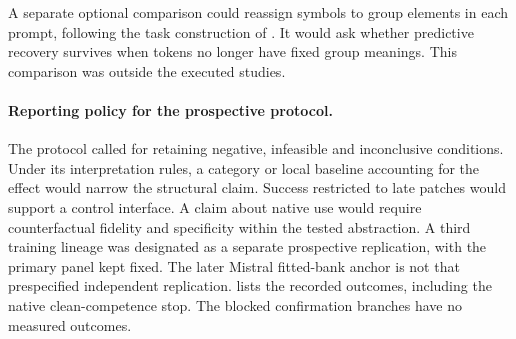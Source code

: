 A separate optional comparison could reassign symbols to group elements in each prompt, following the task construction of \citet[Section~2]{todd2026algebra}. It would ask whether predictive recovery survives when tokens no longer have fixed group meanings. This comparison was outside the executed studies.

\paragraph{Reporting policy for the prospective protocol.}
The protocol called for retaining negative, infeasible and inconclusive conditions. Under its interpretation rules, a category or local baseline accounting for the effect would narrow the structural claim. Success restricted to late patches would support a control interface. A claim about native use would require counterfactual fidelity and specificity within the tested abstraction. A third training lineage was designated as a separate prospective replication, with the primary panel kept fixed. The later Mistral fitted-bank anchor is not that prespecified independent replication.  lists the recorded outcomes, including the native clean-competence stop. The blocked confirmation branches have no measured outcomes.

